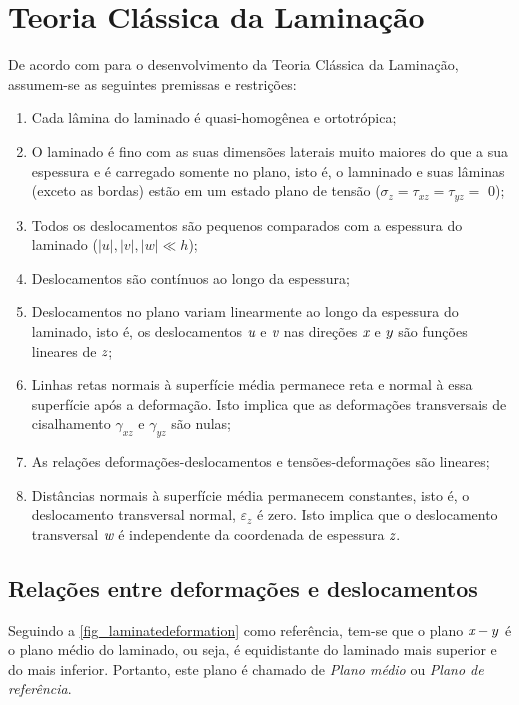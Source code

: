 \section{Teoria Clássica da Laminação}
De acordo com \cite{daniel2006engineering} para o desenvolvimento da Teoria Clássica da Laminação, assumem-se as seguintes premissas e restrições:
\begin{enumerate}
  \item Cada lâmina do laminado é quasi-homogênea e ortotrópica;
	\item O laminado é fino com as suas dimensões laterais muito maiores do que a sua espessura e é carregado somente no plano, isto é, o lamninado e suas lâminas (exceto as bordas) estão em um estado plano de tensão ($\sigma_z = \tau_{xz} = \tau_{yz} =  $ 0);
	\item Todos os deslocamentos são pequenos comparados com a espessura do laminado ($|u|,|v|,|w| \ll h$);
	\item Deslocamentos são contínuos ao longo da espessura;
	\item Deslocamentos no plano variam linearmente ao longo da espessura do laminado, isto é, os deslocamentos $\emph u$ e $\emph v$ nas direções $\emph x$ e $\emph y$ são funções lineares de $\emph z$;
	\item Linhas retas normais à superfície média permanece reta e normal à essa superfície após a deformação. Isto implica que as deformações transversais de cisalhamento $\gamma_{xz}$ e $\gamma_{yz}$ são nulas;
	\item As relações deformações-deslocamentos e tensões-deformações são lineares;
	\item Distâncias normais à superfície média permanecem constantes, isto é, o deslocamento transversal normal, $\varepsilon_{z}$ é zero. Isto implica que o deslocamento transversal $\emph w$ é independente da coordenada de espessura $\emph z$.
\end{enumerate}

\subsection{Relações entre deformações e deslocamentos}
Seguindo a \autoref{fig_laminatedeformation} como referência, tem-se que o plano $\emph x-y$ é o plano médio do laminado, ou seja, é equidistante do laminado mais superior e do mais inferior. Portanto, este plano é chamado de \emph{Plano médio} ou \emph{Plano de referência}.

